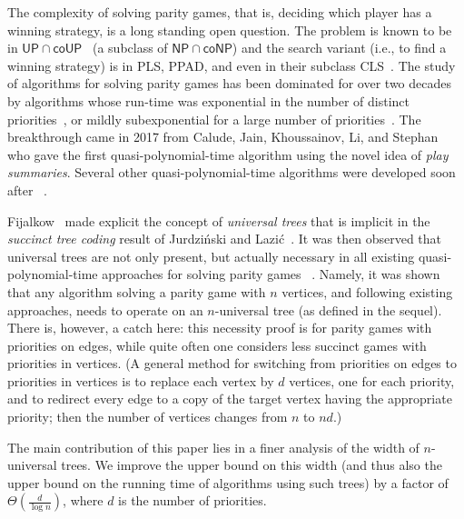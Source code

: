 \documentclass[envcountsect,envcountsame]{llncs}
\begin{document}
	The complexity of solving parity games, that is, deciding which player has a winning strategy, is a long standing open question.
	The problem is known to be in $\mathsf{UP}\cap\mathsf{coUP}$~\cite{up-co-up}
	(a subclass of $\mathsf{NP}\cap\mathsf{coNP}$)
	and the search variant (i.e., to find a winning strategy) is in \textsf{PLS}, \textsf{PPAD}, and even in their subclass \textsf{CLS}~\cite{Daskalakis-Papadimitriou}.
	The study of algorithms for solving parity games has been dominated for over two decades by algorithms
	whose run-time was exponential in the number of distinct priorities~\cite{Zielonka,BCJLM97,Seidl96,old-progress-measure,strategy-improvement,Schewe-big-steps,priority-promotion},
	or mildly subexponential for a large number of priorities~\cite{randomized-subexponential,subexponential}.
	The breakthrough came in 2017 from Calude, Jain, Khoussainov, Li, and Stephan~\cite{calude}
	who gave the first quasi-polynomial-time algorithm using the novel idea of \emph{play summaries}.
	Several other quasi-polynomial-time algorithms were developed soon after~%
	\cite{progress-measure,ordered-qpt,Lehtinen,Zielonka-Parys,Zielonka-Parys-journal,Strahler-number,symmetric-lifting,Parysian-flair}.

	Fijalkow~\cite{fijalkow} made explicit the concept of \emph{universal trees} that is implicit in the \emph{succinct tree coding} result of Jurdziński and Lazić~\cite{progress-measure}.
	It was then observed that universal trees are not only present, but actually necessary in all existing quasi-polynomial-time approaches for solving parity games~%
	\cite{universal-trees,Zielonka-Parys-universal,fixpoints}.
	Namely, it was shown that any algorithm solving a parity game with $n$ vertices, and following existing approaches,
	needs to operate on an $n$-universal tree (as defined in the sequel).
	There is, however, a catch here: this necessity proof is for parity games with priorities on edges, while quite often one considers less succinct games with priorities in vertices.
	(A general method for switching from priorities on edges to priorities in vertices is to replace each vertex by $d$ vertices, one for each priority,
	and to redirect every edge to a copy of the target vertex having the appropriate priority; then the number of vertices changes from $n$ to $nd$.)

	The main contribution of this paper lies in a finer analysis of the width of $n$-universal trees.
	We improve the upper bound on this width (and thus also the upper bound on the running time of algorithms using such trees) by a factor of $\Theta\left(\frac{d}{\log n}\right)$,
	where $d$ is the number of priorities.
\end{document}
